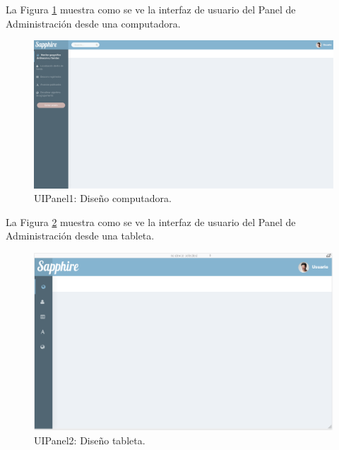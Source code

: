 La Figura \ref{PA:1} muestra como se ve la interfaz de usuario del Panel de Administración desde una computadora.
\FloatBarrier
\begin{figure}[htbp!]
		\centering
			\includegraphics[width=.9 \textwidth]{imagenes/panelAdmin/panelAdmin}
		\caption{UIPanel1: Diseño computadora.}
		\label{PA:1}
\end{figure}
\FloatBarrier
La Figura \ref{PA:2} muestra como se ve la interfaz de usuario del Panel de Administración desde una tableta.
\FloatBarrier
\begin{figure}[htbp!]
		\centering
			\includegraphics[width=.9 \textwidth]{imagenes/panelAdmin/tab}
		\caption{UIPanel2: Diseño tableta.}
		\label{PA:2}
\end{figure}
\FloatBarrier
